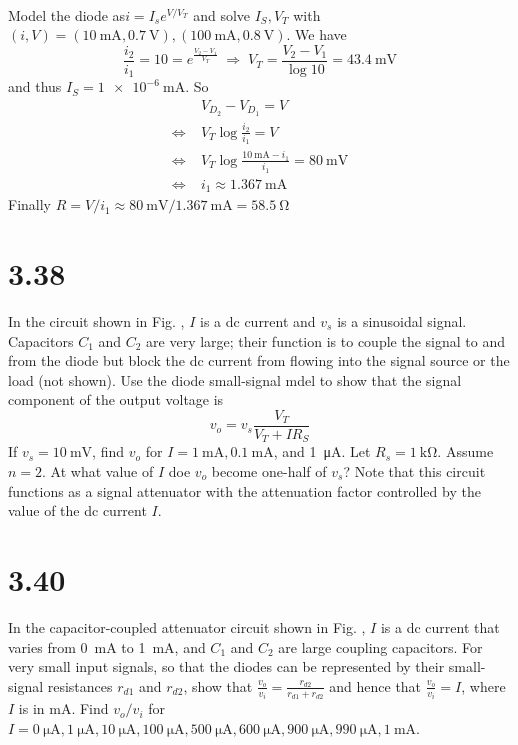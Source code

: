 \documentclass[12pt, a4paper]{article}
\newcommand{\siua}{\micro\ampere}
\newcommand{\sima}{\milli\ampere}
\newcommand{\simv}{\milli\volt}
\newcommand{\siko}{\kilo\ohm}
\theoremstyle{mystyle}	%
\newcommand{\Ans}{\noindent{\bf Ans:}}
\begin{document}
\Ans \\
Model the diode as$ i = I_s e^{V / V_T} $ and solve $I_S, V_T$ with $(i, V) = (\SI{10}\mA, \SI{0.7}{\V}), (\SI{100}\mA, \SI{0.8}{\V})$. We have
\[
\frac{i_2}{i_1} = 10 = e^{\frac{V_2 - V_1}{V_T}} \; \Rightarrow \; V_T = \frac{V_2 - V_1}{ \log 10 } = \SI{43.4}\mV \]
and thus $I_S = \SI{1e-6}{\mA}$. So
\begin{align*}
  & V_{D_2} - V_{D_1} = V \\
  \Leftrightarrow \; &V_T \log \frac{i_2}{i_1} = V \\
  \Leftrightarrow \; &V_T \log \frac{\SI{10}\mA - i_1}{i_1} = \SI{80}\mV \\
  \Leftrightarrow \; &i_1 \approx \SI{1.367}{\mA}
\end{align*}
Finally $R = V / i_1 \approx \SI{80}\mV / \SI{1.367}\mA = \SI{58.5}\ohm$

\section{3.38}
In the circuit shown in Fig. , $I$ is a dc current and $v_s$ is a
sinusoidal signal. Capacitors $C_1$ and $C_2$ are very large; their
function is to couple the signal to and from the diode but block the
dc current from flowing into the signal source or the load (not shown).
Use the diode small-signal mdel to show that the signal component of the
output voltage is
\[ v_o = v_s \frac{V_T}{V_T + IR_S} \]
If $v_s = \SI{10}{\simv}$, find $v_o$ for
$I = \SI{1}{\sima}, \SI{0.1}{\sima}$, and
\SI{1}{\siua}. Let $R_s = \SI{1}{\siko}$. Assume $n = 2$. At
what value of $I$ doe $v_o$ become one-half of $v_s$?
Note that this circuit functions as a signal attenuator with the
attenuation factor controlled by the value of the dc current $I$.

\section{3.40}
In the capacitor-coupled attenuator circuit shown in Fig. ,
$I$ is a dc current that varies from \SI{0}{\sima} to
\SI{1}{\sima}, and $C_1$ and $C_2$ are large coupling capacitors.
For very small input signals, so that the diodes can be represented by
their small-signal resistances $r_{d1}$ and $r_{d2}$, show that
$\displaystyle \frac{v_o}{v_i} = \frac{r_{d2}}{r_{d1}+r_{d2}}$ and hence
that $\displaystyle \frac{v_o}{v_i}  = I$, where $I$ is in
\si{\sima}. Find $v_o/v_i$ for $I = \SI{0}{\siua}, \SI{1}{\siua},
\SI{10}{\siua}, \SI{100}{\siua}, \SI{500}{\siua}, \SI{600}{\siua},
\SI{900}{\siua}, \SI{990}{\siua}, \SI{1}{\sima}$.
\end{document}
